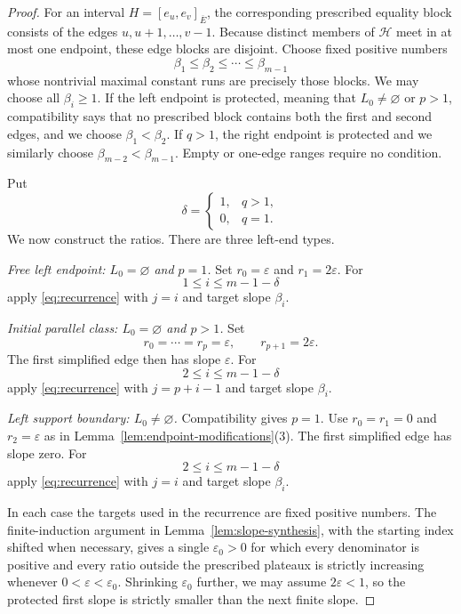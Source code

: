 \documentclass{amsart}
\numberwithin{equation}{section}
\theoremstyle{definition}
\theoremstyle{remark}
\begin{document}
\begin{proof}
For an interval $H=[e_u,e_v]_{\overline E}$, the corresponding prescribed equality block consists of the edges $u,u+1,\ldots,v-1$.  Because distinct members of $\mathcal H$ meet in at most one endpoint, these edge blocks are disjoint.  Choose fixed positive numbers
\[
 \beta_1\le\beta_2\le\cdots\le\beta_{m-1}
\]
whose nontrivial maximal constant runs are precisely those blocks.  We may choose all $\beta_i\ge1$.  If the left endpoint is protected, meaning that $L_0\ne\varnothing$ or $p>1$, compatibility says that no prescribed block contains both the first and second edges, and we choose $\beta_1<\beta_2$.  If $q>1$, the right endpoint is protected and we similarly choose $\beta_{m-2}<\beta_{m-1}$.  Empty or one-edge ranges require no condition.

Put
\[
 \delta=\begin{cases}1,&q>1,\\0,&q=1.\end{cases}
\]
We now construct the ratios.  There are three left-end types.

\smallskip
\emph{Free left endpoint: $L_0=\varnothing$ and $p=1$.}
Set $r_0=\varepsilon$ and $r_1=2\varepsilon$.  For
\[
 1\le i\le m-1-\delta
\]
apply \eqref{eq:recurrence} with $j=i$ and target slope $\beta_i$.

\smallskip
\emph{Initial parallel class: $L_0=\varnothing$ and $p>1$.}
Set
\[
 r_0=\cdots=r_p=\varepsilon,
 \qquad r_{p+1}=2\varepsilon.
\]
The first simplified edge then has slope $\varepsilon$.  For
\[
 2\le i\le m-1-\delta
\]
apply \eqref{eq:recurrence} with $j=p+i-1$ and target slope $\beta_i$.

\smallskip
\emph{Left support boundary: $L_0\ne\varnothing$.}
Compatibility gives $p=1$.  Use $r_0=r_1=0$ and $r_2=\varepsilon$ as in Lemma~\ref{lem:endpoint-modifications}(3).  The first simplified edge has slope zero.  For
\[
 2\le i\le m-1-\delta
\]
apply \eqref{eq:recurrence} with $j=i$ and target slope $\beta_i$.

In each case the targets used in the recurrence are fixed positive numbers.  The finite-induction argument in Lemma~\ref{lem:slope-synthesis}, with the starting index shifted when necessary, gives a single $\varepsilon_0>0$ for which every denominator is positive and every ratio outside the prescribed plateaux is strictly increasing whenever $0<\varepsilon<\varepsilon_0$.  Shrinking $\varepsilon_0$ further, we may assume $2\varepsilon<1$, so the protected first slope is strictly smaller than the next finite slope.


\end{proof}
\end{document}
